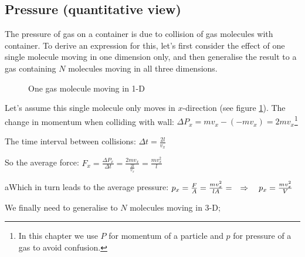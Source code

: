 \subsection{Pressure (quantitative view)}

The pressure of gas on a container is due to collision of gas molecules with container. To derive an expression for this, let's first consider the effect of one single molecule moving in one dimension only, and then generalise the result to a gas containing $N$ molecules moving in all three dimensions.

\begin{figure}[ht]
\centering
{}

\caption{One gas molecule moving in 1-D}
\label{onedmol}
\end{figure}

Let's assume this single molecule only moves in $x$-direction (see figure \ref{onedmol}). The change in momentum when colliding with wall: $\Delta P_x = mv_x - (-mv_x) = 2mv_x$\footnote{In this chapter we use $P$ for momentum of a particle and $p$ for pressure of a gas to avoid confusion.}

The time interval between collisions: $\Delta t=\frac{2l}{v_x}$

So the average force: $F_x=\frac{\Delta P_x}{\Delta t} = \frac{2mv_x}{\tfrac{2l}{v_x}} = \frac{mv_x^2}{l}$

aWhich in turn leads to the average pressure: $p_x=\frac{F}{A} = \frac{mv_x^2}{lA} = \quad \Rightarrow \quad p_x = \frac{mv_x^2}{V}$

We finally need to generalise to $N$ molecules moving in 3-D;

